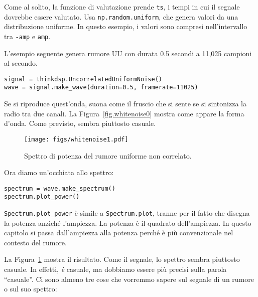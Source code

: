 \documentclass[12pt,a4paper]{book}
\begin{document}
Come al solito, la funzione di valutazione prende {\tt ts}, i tempi in cui il segnale dovrebbe essere valutato. Usa {\tt np.random.uniform}, che genera valori da una distribuzione uniforme. In questo esempio, i valori sono compresi nell'intervallo tra {\tt -amp} e {\tt amp}.

L'esempio seguente genera rumore UU con durata 0.5 secondi a 11,025 campioni al secondo.

\begin{verbatim} 
signal = thinkdsp.UncorrelatedUniformNoise()
wave = signal.make_wave(duration=0.5, framerate=11025)
 \end{verbatim} 

Se si riproduce quest'onda, suona come il fruscio che si sente se si sintonizza la radio tra due canali. La Figura~\ref{fig.whitenoise0} mostra come appare la forma d'onda. Come previsto, sembra piuttosto casuale.

\begin{figure} 

\centerline{\texttt{[image: figs/whitenoise1.pdf]}} \caption{Spettro di potenza del rumore uniforme non correlato.} \label{fig.whitenoise1} \end{figure} 

Ora diamo un'occhiata allo spettro:

\begin{verbatim} 
spectrum = wave.make_spectrum()
spectrum.plot_power()
 \end{verbatim} 

\verb"Spectrum.plot_power" è simile a \verb"Spectrum.plot", tranne per il fatto che disegna la potenza anziché l'ampiezza. La potenza è il quadrato dell'ampiezza. In questo capitolo si passa dall'ampiezza alla potenza perché è più convenzionale nel contesto del rumore.

La Figura~\ref{fig.whitenoise1} mostra il risultato. Come il segnale, lo spettro sembra piuttosto casuale. In effetti, {\em è} casuale, ma dobbiamo essere più precisi sulla parola ``casuale''. Ci sono almeno tre cose che vorremmo sapere sul segnale di un rumore o sul suo spettro:
\end{document}
